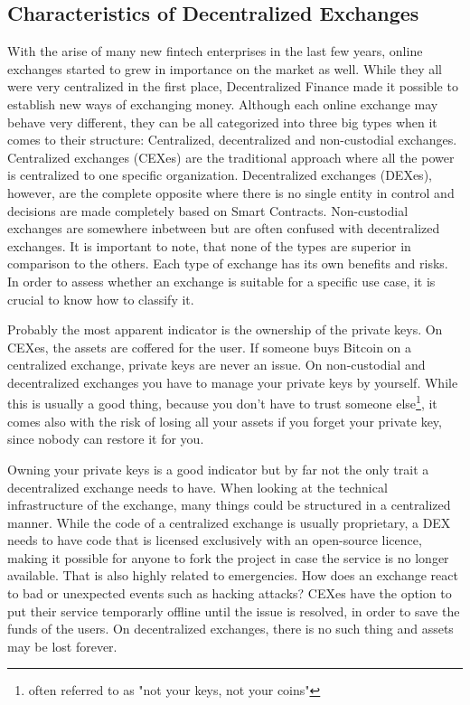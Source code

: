 \subsection{Characteristics of Decentralized Exchanges}
With the arise of many new fintech enterprises in the last few years, online exchanges started to grew in importance on the market as well. While they all were very centralized in the first place, Decentralized Finance made it possible to establish new ways of exchanging money. Although each online exchange may behave very different, they can be all categorized into three big types when it comes to their structure: Centralized, decentralized and non-custodial exchanges. Centralized exchanges (CEXes) are the traditional approach where all the power is centralized to one specific organization. Decentralized exchanges (DEXes), however, are the complete opposite where there is no single entity in control and decisions are made completely based on Smart Contracts. Non-custodial exchanges are somewhere inbetween but are often confused with decentralized exchanges. It is important to note, that none of the types are superior in comparison to the others. Each type of exchange has its own benefits and risks. In order to assess whether an exchange is suitable for a specific use case, it is crucial to know how to classify it.

Probably the most apparent indicator is the ownership of the private keys. On CEXes, the assets are coffered for the user. If someone buys Bitcoin on a centralized exchange, private keys are never an issue. On non-custodial and decentralized exchanges you have to manage your private keys by yourself. While this is usually a good thing, because you don't have to trust someone else\footnote{often referred to as "not your keys, not your coins"}, it comes also with the risk of losing all your assets if you forget your private key, since nobody can restore it for you.

Owning your private keys is a good indicator but by far not the only trait a decentralized exchange needs to have. When looking at the technical infrastructure of the exchange, many things could be structured in a centralized manner. While the code of a centralized exchange is usually proprietary, a DEX needs to have code that is licensed exclusively with an open-source licence, making it possible for anyone to fork the project in case the service is no longer available. That is also highly related to emergencies. How does an exchange react to bad or unexpected events such as hacking attacks? CEXes have the option to put their service temporarly offline until the issue is resolved, in order to save the funds of the users. On decentralized exchanges, there is no such thing and assets may be lost forever.

